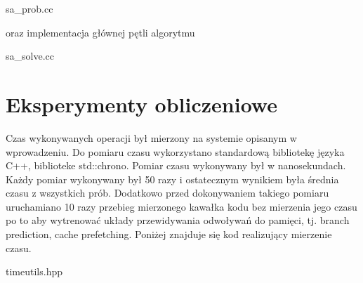 \documentclass[polish,polish,a4paper]{article}
\begin{document}

{sa_prob.cc}

oraz implementacja głównej pętli algorytmu


{sa_solve.cc}

\pagebreak
\section{Eksperymenty obliczeniowe}
Czas wykonywanych operacji był mierzony na systemie opisanym w wprowadzeniu.
Do pomiaru czasu wykorzystano standardową bibliotekę języka C++, biblioteke std::chrono.
Pomiar czasu wykonywany był w nanosekundach. Każdy pomiar wykonywany był 50 razy i ostatecznym wynikiem była średnia czasu z wszystkich prób.
Dodatkowo przed dokonywaniem takiego pomiaru uruchamiano 10 razy przebieg mierzonego kawałka kodu bez mierzenia jego czasu po to aby wytrenować układy przewidywania odwoływań do pamięci,
tj. branch prediction, cache prefetching.
Poniżej znajduje się kod realizujący mierzenie czasu.


{timeutils.hpp}
\end{document}
